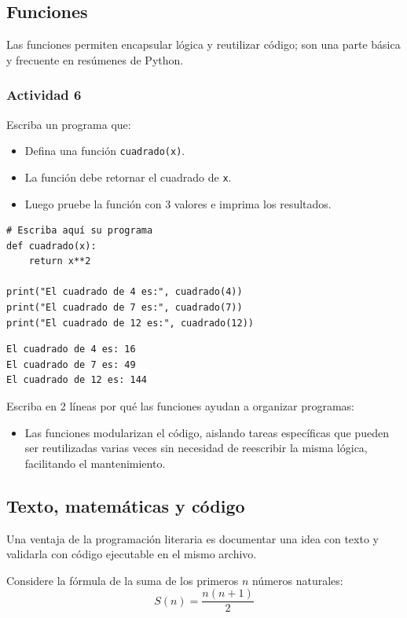 \documentclass{article}
\begin{document}
\subsection{Funciones}
\label{sec:org685aecf}
Las funciones permiten encapsular lógica y reutilizar código; son una parte básica y frecuente en resúmenes de Python.

\subsubsection{Actividad 6}
\label{sec:orgc314f01}
Escriba un programa que:
\begin{itemize}
\item Defina una función \texttt{cuadrado(x)}.
\item La función debe retornar el cuadrado de \texttt{x}.
\item Luego pruebe la función con 3 valores e imprima los resultados.
\end{itemize}

\begin{verbatim}
# Escriba aquí su programa
def cuadrado(x):
    return x**2

print("El cuadrado de 4 es:", cuadrado(4))
print("El cuadrado de 7 es:", cuadrado(7))
print("El cuadrado de 12 es:", cuadrado(12))
\end{verbatim}

\begin{verbatim}
El cuadrado de 4 es: 16
El cuadrado de 7 es: 49
El cuadrado de 12 es: 144
\end{verbatim}


Escriba en 2 líneas por qué las funciones ayudan a organizar programas:
\begin{itemize}
\item Las funciones modularizan el código, aislando tareas específicas que pueden ser reutilizadas varias veces sin necesidad de reescribir la misma lógica, facilitando el mantenimiento.
\end{itemize}

\subsection{Texto, matemáticas y código}
\label{sec:org43cadc7}
Una ventaja de la programación literaria es documentar una idea con texto y validarla con código ejecutable en el mismo archivo.

Considere la fórmula de la suma de los primeros \(n\) números naturales:
\[
S(n) = \frac{n(n+1)}{2}
\]
\end{document}
